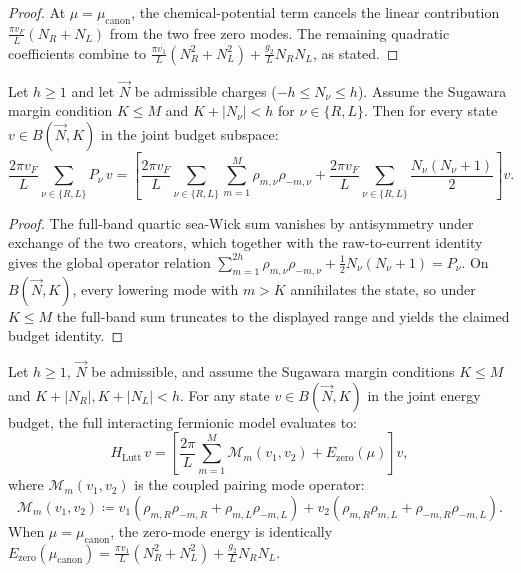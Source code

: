\begin{proof}
At $\mu=\mu_{\mathrm{canon}}$, the chemical-potential term cancels the linear contribution $\frac{\pi v_F}{L}(N_R+N_L)$ from the two free zero modes. The remaining quadratic coefficients combine to $\frac{\pi v_1}{L}(N_R^2+N_L^2)+\frac{g_2}{L}N_RN_L$, as stated.
\end{proof}

\begin{theorem}
\label{thm:free_kinetic_sugawara}
Let $h \ge 1$ and let $\vec{N}$ be admissible charges ($-h \le N_\nu \le h$).
Assume the Sugawara margin condition $K \le M$ and $K + |N_\nu| < h$ for $\nu \in \{R, L\}$.
Then for every state $v \in B(\vec{N}, K)$ in the joint budget subspace:
\begin{equation}
\frac{2\pi v_F}{L} \sum_{\nu \in \{R, L\}} P_\nu \, v = \left[ \frac{2\pi v_F}{L} \sum_{\nu \in \{R, L\}} \sum_{m=1}^M \rho_{m, \nu} \rho_{-m, \nu} + \frac{2\pi v_F}{L} \sum_{\nu \in \{R, L\}} \frac{N_\nu(N_\nu + 1)}{2} \right] v.
\end{equation}
\end{theorem}

\begin{proof}
The full-band quartic sea-Wick sum vanishes by antisymmetry under exchange of the two creators, which together with the raw-to-current identity gives the global operator relation $\sum_{m=1}^{2h}\rho_{m,\nu}\rho_{-m,\nu}+\frac12N_\nu(N_\nu+1)=P_\nu$. On $B(\vec N,K)$, every lowering mode with $m>K$ annihilates the state, so under $K\le M$ the full-band sum truncates to the displayed range and yields the claimed budget identity.
\end{proof}

\begin{theorem}
\label{thm:luttinger_hamiltonian_budget}
Let $h \ge 1$, $\vec{N}$ be admissible, and assume the Sugawara margin conditions $K \le M$ and $K+|N_R|,K+|N_L|<h$.
For any state $v \in B(\vec{N}, K)$ in the joint energy budget, the full interacting fermionic model evaluates to:
\begin{equation}
H_{\mathrm{Lutt}} \, v = \left[ \frac{2\pi}{L} \sum_{m=1}^M \mathcal{M}_m(v_1, v_2) + E_{\mathrm{zero}}(\mu) \right] v,
\end{equation}
where $\mathcal{M}_m(v_1, v_2)$ is the coupled pairing mode operator:
\begin{equation}
\mathcal{M}_m(v_1, v_2) \coloneqq v_1 \left( \rho_{m, R} \rho_{-m, R} + \rho_{m, L} \rho_{-m, L} \right) + v_2 \left( \rho_{m, R} \rho_{m, L} + \rho_{-m, R} \rho_{-m, L} \right).
\end{equation}
When $\mu = \mu_{\mathrm{canon}}$, the zero-mode energy is identically $E_{\mathrm{zero}}(\mu_{\mathrm{canon}}) = \frac{\pi v_1}{L}(N_R^2 + N_L^2) + \frac{g_2}{L} N_R N_L$.
\end{theorem}

